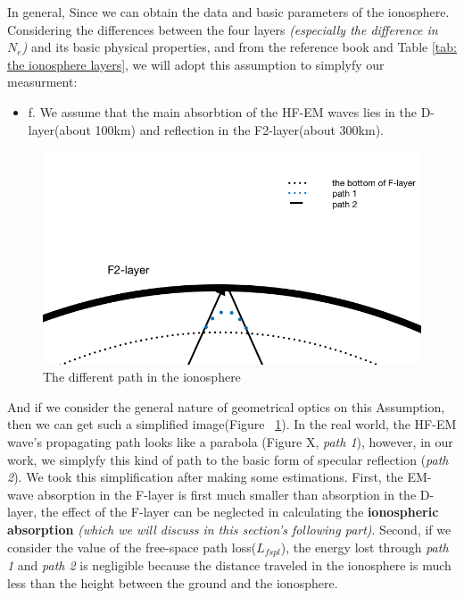 \documentclass{mcmthesis}
\begin{document}
    In general, Since we can obtain the data and basic parameters of the ionosphere. Considering the differences between the four layers \emph{(especially the difference in $N_{e}$)} and its basic physical properties, and from the reference book\cite{davies1990ionospheric,terman1943radio} and Table \ref{tab: the ionosphere layers}, we will adopt this assumption to simplyfy our measurment:

    \begin{itemize}
      \item f. We assume that the main absorbtion of the HF-EM waves lies in the D-layer(about 100km) and reflection in the F2-layer(about 300km).
    \end{itemize}

    \begin{figure}[ht]
    \centering
    \includegraphics[scale=0.5]{PathinIonosphere}
    \caption{The different path in the ionosphere}
    \label{fig:PathinIonosphere}
    \end{figure}

    And if we consider the general nature of geometrical optics on this Assumption, then we can get such a simplified image(Figure ~\ref{fig:PathinIonosphere}). In the real world, the HF-EM wave's propagating path looks like a parabola (Figure X, \emph{path 1}), however, in our work, we simplyfy this kind of path to the basic form of specular reflection (\emph{path 2}). We took this simplification after making some estimations. First, the EM-wave absorption in the F-layer is first much smaller than absorption in the D-layer, the effect of the F-layer can be neglected in calculating the \textbf{ionospheric absorption} \emph{(which we will discuss in this section's following part)}. Second, if we consider the value of the free-space path loss($L_{fspl}$), the energy lost through \emph{path 1} and \emph{path 2} is negligible because the distance traveled in the ionosphere is much less than the height between the ground and the ionosphere.
\end{document}
